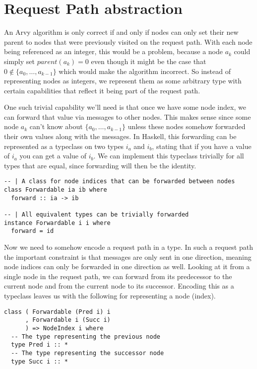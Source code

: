 \documentclass[a4paper, oneside]{discothesis}
\begin{document}
\section{Request Path abstraction}

An Arvy algorithm is only correct if and only if nodes can only set their new parent to nodes that were previously visited on the request path. With each node being referenced as an integer, this would be a problem, because a node $a_{k}$ could simply set $parent(a_{k})=0$ even though it might be the case that $0\notin\{a_{0},\dots,a_{k-1}\}$ which would make the algorithm incorrect. So instead of representing nodes as integers, we represent them as some arbitrary type with certain capabilities that reflect it being part of the request path.

One such trivial capability we'll need is that once we have some node index, we can forward that value via messages to other nodes. This makes sense since some node $a_{k}$ can't know about $\{a_{0},\dots,a_{k-1}\}$ unless these nodes somehow forwarded their own values along with the messages. In Haskell, this forwarding can be represented as a typeclass on two types $i_a$ and $i_b$, stating that if you have a value of $i_a$ you can get a value of $i_b$. We can implement this typeclass trivially for all types that are equal, since forwarding will then be the identity.

\begin{verbatim}
-- | A class for node indices that can be forwarded between nodes
class Forwardable ia ib where
  forward :: ia -> ib

-- | All equivalent types can be trivially forwarded
instance Forwardable i i where
  forward = id
\end{verbatim}

Now we need to somehow encode a request path in a type. In such a request path the important constraint is that messages are only sent in one direction, meaning node indices can only be forwarded in one direction as well. Looking at it from a single node in the request path, we can forward from its predecessor to the current node and from the current node to its successor. Encoding this as a typeclass leaves us with the following for representing a node (index).

\begin{verbatim}
class ( Forwardable (Pred i) i
      , Forwardable i (Succ i)
      ) => NodeIndex i where
  -- The type representing the previous node
  type Pred i :: *
  -- The type representing the successor node
  type Succ i :: *
\end{verbatim}
\end{document}
